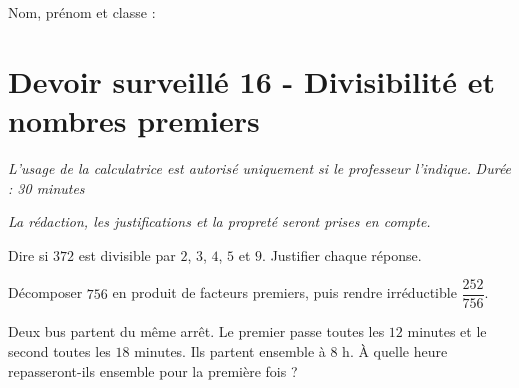 \documentclass[a4paper,10pt]{report}
\begin{document}
\pagestyle{empty}
\noindent Nom, prénom et classe : \dotfill

\section*{Devoir surveillé 16 - Divisibilité et nombres premiers}

\noindent \textit{L'usage de la calculatrice est autorisé uniquement si le professeur l'indique.} \hfill \textit{Durée : 30 minutes}

\medskip
\noindent \textit{La rédaction, les justifications et la propreté seront prises en compte.}


\begin{ex}[Divisibilité]
Dire si $372$ est divisible par $2$, $3$, $4$, $5$ et $9$. Justifier chaque réponse.
\medskip\noindent\grandscarreaux{\linewidth}{3.5cm}
\end{ex}
\begin{ex}
Décomposer $756$ en produit de facteurs premiers, puis rendre irréductible $\dfrac{252}{756}$.
\medskip\noindent\grandscarreaux{\linewidth}{5cm}
\end{ex}
\begin{ex}[Problème]
Deux bus partent du même arrêt. Le premier passe toutes les $12$ minutes et le second toutes les $18$ minutes. Ils partent ensemble à $8$ h. À quelle heure repasseront-ils ensemble pour la première fois ?
\medskip\noindent\grandscarreaux{\linewidth}{4cm}
\end{ex}
\end{document}
